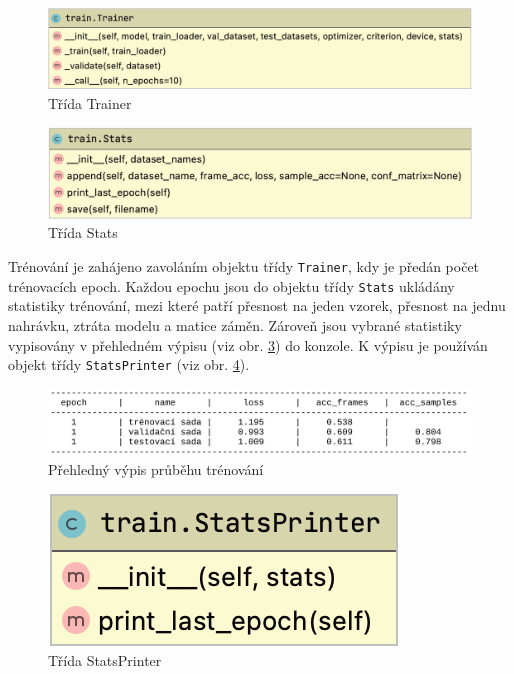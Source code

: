 \documentclass[FM,BP]{tulthesis}
\begin{document}
\begin{figure}[ht]
\centerline{\includegraphics[scale=.3]{train-trainer.png}}
\caption{Třída Trainer}
\label{fig:trainer}
\end{figure}
\FloatBarrier

\begin{figure}[ht]
\centerline{\includegraphics[scale=.3]{train-stats.png}}
\caption{Třída Stats}
\label{fig:stats}
\end{figure}
\FloatBarrier

Trénování je zahájeno zavoláním objektu třídy \texttt{\mbox{Trainer}}, kdy je předán počet trénovacích epoch. Každou epochu jsou do objektu třídy \texttt{\mbox{Stats}} ukládány statistiky trénování, mezi které patří přesnost na jeden vzorek, přesnost na jednu nahrávku, ztráta modelu a matice záměn. Zároveň jsou vybrané statistiky vypisovány v přehledném výpisu (viz obr. \mbox{\ref{fig:print}}) do konzole. K výpisu je používán objekt třídy \texttt{\mbox{StatsPrinter}} (viz obr. \mbox{\ref{fig:printer}}).

\begin{figure}[ht]
\centerline{\includegraphics[scale=.21]{train_log.png}}
\caption{Přehledný výpis průběhu trénování}
\label{fig:print}
\end{figure}
\FloatBarrier

\begin{figure}[htbp]
\centerline{\includegraphics[scale=.3]{train-stats_printer.png}}
\caption{Třída StatsPrinter}
\label{fig:printer}
\end{figure}
\FloatBarrier
\end{document}
